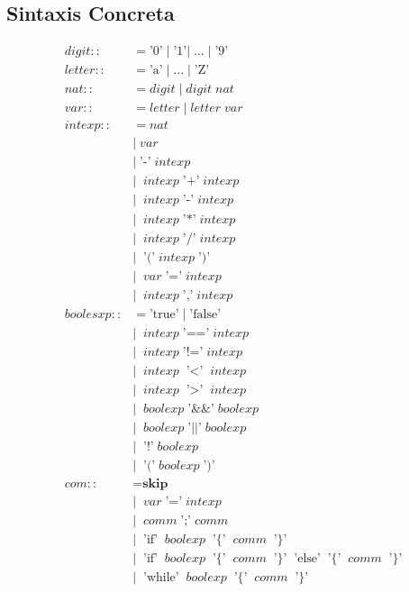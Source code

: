 \documentclass[11pt]{article}
\begin{document}

\subsection*{Sintaxis Concreta}

\begin{align*}
  digit ::&= \text{'0'} \; | \; \text{'1'} | \; \dotsc \; | \; \text{'9'} \\
  letter ::&= \text{'a'} \; | \; \dotsc \; | \; \text{'Z'} \\
  nat ::&= digit \; | \; digit \; nat \\
  var ::&= letter \; | \; letter \; var \\
  intexp ::&= nat \\
           &| \; var \\
           &| \; \text{'-'} \; intexp \\
           &| \;\; intexp \; \text{'+'}  \; intexp \\
           &| \;\; intexp \; \text{'-'}  \; intexp \\
           &| \;\; intexp \; \text{'*'}  \; intexp \\
           &| \;\; intexp \; \text{'/'}  \; intexp \\
           &| \;\; \text{'('} \; intexp \; \text{')'} \\
           &| \;\; var \; \text{'='} \; intexp \\
           &| \;\; intexp \; \text{','} \; intexp \\
boolesxp ::&= \text{'true'} \; | \; \text{'false'} \\
           &| \;\; intexp \; \text{'=='} \; intexp \\
           &| \;\; intexp \; \text{'!='}  \; intexp \\
           &| \;\; intexp \; \text{'$<$'}  \; intexp \\
           &| \;\; intexp \; \text{'$>$'}  \; intexp \\
           &| \;\; boolexp \; \text{'\&\&'}  \; boolexp \\
           &| \;\; boolexp \; \text{'$\vert\vert$'}  \; boolexp \\
           &| \;\; \text{'!'} \; boolexp \\
           &| \;\; \text{'('} \; boolexp \; \text{')'} \\
com ::&= \textbf{skip} \\
      &| \;\; var \; \text{'='} \; intexp \\
      &| \;\; comm \; \text{';'} \; comm \\
      &| \;\; \text{'if'} \;\;boolexp \;\; \text{'\{'} \;\; comm \;\; \text{'\}'} \\
      &| \;\; \text{'if'} \;\;boolexp \;\; \text{'\{'} \;\; comm \;\; \text{'\}'}  \;\; \text{'else'} \;\; \text{'\{'} \;\; comm \;\; \text{'\}'} \\
      &| \;\; \text{'while'} \;\;boolexp \;\; \text{'\{'} \;\; comm \;\; \text{'\}'} \\
\end{align*}
\end{document}
